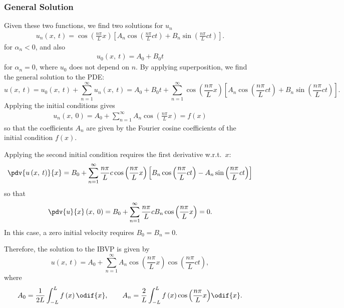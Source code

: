 \documentclass{article}
\begin{document}
\subsubsection{General Solution}
Given these two functions, we find two solutions for \(u_n\)
\begin{align*}
    u_n\left( x,\: t \right) = \cos{\left( \frac{n \pi}{L} x \right)} \left[ A_n \cos{\left( \frac{n \pi}{L} c t \right)} + B_n \sin{\left( \frac{n \pi}{L} c t \right)} \right].
\end{align*}
for \(\alpha_n < 0\), and also
\begin{align*}
    u_0\left( x,\: t \right) = A_0 + B_0 t
\end{align*}
for \(\alpha_n = 0\), where \(u_0\) does not depend on \(n\).
By applying superposition, we find the general solution to the PDE\@:
\begin{equation*}
    u\left( x,\: t \right) = u_0\left( x,\: t \right) + \sum_{n = 1}^\infty u_n\left( x,\: t \right) = A_0 + B_0 t + \sum_{n = 1}^\infty \cos{\left( \frac{n \pi}{L} x \right)} \left[ A_n \cos{\left( \frac{n \pi}{L} c t \right)} + B_n \sin{\left( \frac{n \pi}{L} c t \right)} \right].
\end{equation*}
Applying the initial conditions gives
\begin{align*}
    u_n\left( x,\: 0 \right) = A_0 + \sum_{n = 1}^\infty A_n \cos{\left( \frac{n \pi}{L} x \right)} = f\left( x \right)
\end{align*}
so that the coefficients \(A_n\) are given by the Fourier cosine coefficients of the initial condition \(f\left( x \right)\).

Applying the second initial condition requires the first derivative
w.r.t.\ \(x\):
\begin{equation*}
    \pdv{u\left( x,\: t \right)}{x} = B_0 + \sum_{n = 1}^\infty \frac{n \pi}{L} c \cos{\left( \frac{n \pi}{L} x \right)} \left[ B_n \cos{\left( \frac{n \pi}{L} c t \right)} - A_n \sin{\left( \frac{n \pi}{L} c t \right)} \right]
\end{equation*}
so that
\begin{equation*}
    \pdv{u}{x}\left( x,\: 0 \right) = B_0 + \sum_{n = 1}^\infty \frac{n \pi}{L} c B_n \cos{\left( \frac{n \pi}{L} x \right)} = 0.
\end{equation*}
In this case, a zero initial velocity requires \(B_0 = B_n = 0\).

Therefore, the solution to the IBVP is given by
\begin{equation*}
    u\left( x,\: t \right) = A_0 + \sum_{n = 1}^\infty A_n \cos{\left( \frac{n \pi}{L} x \right)} \cos{\left( \frac{n \pi}{L} c t \right)},
\end{equation*}
where
\begin{equation*}
    A_0 = \frac{1}{2L} \int_{-L}^L f\left( x \right) \odif{x}, \quad\quad A_n = \frac{2}{L} \int_{-L}^{L} f\left( x \right) \cos{\left( \frac{n \pi}{L} x \right)} \odif{x}.
\end{equation*}
\end{document}

